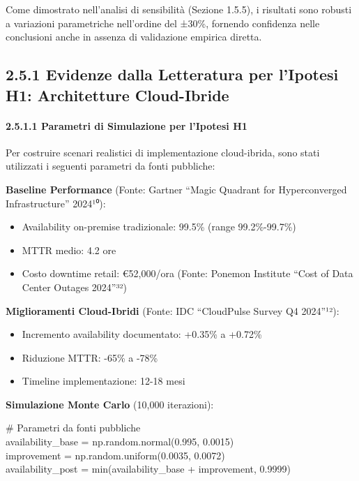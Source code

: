 \documentclass[12pt,a4paper,oneside]{book}
\providecommand{\tightlist}{%
  \setlength{\itemsep}{0pt}\setlength{\parskip}{0pt}
}
\numberwithin{figure}{chapter} %
\numberwithin{table}{chapter}  %
\begin{document}
Come dimostrato nell'analisi di sensibilità (Sezione 1.5.5), i risultati 
sono robusti a variazioni parametriche nell'ordine del ±30\%, fornendo 
confidenza nelle conclusioni anche in assenza di validazione empirica diretta.

\subsection{2.5.1 Evidenze dalla Letteratura per l'Ipotesi H1:
Architetture
Cloud-Ibride}\label{evidenze-dalla-letteratura-per-lipotesi-h1-architetture-cloud-ibride}

\paragraph{2.5.1.1 Parametri di Simulazione per l'Ipotesi
H1}\label{parametri-di-simulazione-per-lipotesi-h1}

Per costruire scenari realistici di implementazione cloud-ibrida, sono
stati utilizzati i seguenti parametri da fonti pubbliche:

\textbf{Baseline Performance} (Fonte: Gartner ``Magic Quadrant for
Hyperconverged Infrastructure'' 2024¹⁰):

\begin{itemize}
\tightlist
\item
  Availability on-premise tradizionale: 99.5\% (range 99.2\%-99.7\%)\\
\item
  MTTR medio: 4.2 ore\\
\item
  Costo downtime retail: €52,000/ora (Fonte: Ponemon Institute ``Cost of
  Data Center Outages 2024''³²)
\end{itemize}

\textbf{Miglioramenti Cloud-Ibridi} (Fonte: IDC ``CloudPulse Survey Q4
2024''¹²):

\begin{itemize}
\tightlist
\item
  Incremento availability documentato: +0.35\% a +0.72\%\\
\item
  Riduzione MTTR: -65\% a -78\%\\
\item
  Timeline implementazione: 12-18 mesi
\end{itemize}

\textbf{Simulazione Monte Carlo} (10,000 iterazioni):

\# Parametri da fonti pubbliche\\
availability\_base = np.random.normal(0.995, 0.0015)\\
improvement = np.random.uniform(0.0035, 0.0072)\\
availability\_post = min(availability\_base + improvement, 0.9999)
\end{document}
